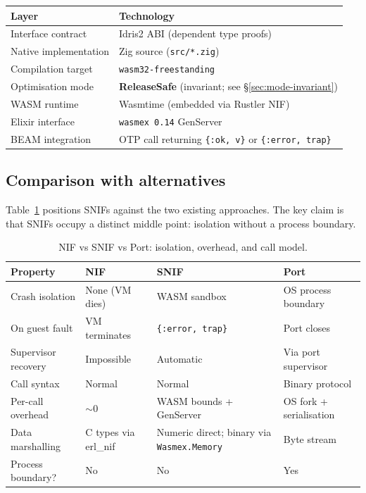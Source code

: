 \documentclass[11pt,a4paper]{article}
\begin{document}
\begin{center}
\begin{tabular}{ll}
\toprule
\textbf{Layer} & \textbf{Technology} \\
\midrule
Interface contract & Idris2 ABI (dependent type proofs) \\
Native implementation & Zig source (\texttt{src/*.zig}) \\
Compilation target & \texttt{wasm32-freestanding} \\
Optimisation mode & \textbf{ReleaseSafe} (invariant; see \S\ref{sec:mode-invariant}) \\
WASM runtime & Wasmtime (embedded via Rustler NIF) \\
Elixir interface & \texttt{wasmex 0.14} GenServer \\
BEAM integration & OTP call returning \texttt{\{:ok, v\}} or \texttt{\{:error, trap\}} \\
\bottomrule
\end{tabular}
\end{center}

\subsection{Comparison with alternatives}

Table~\ref{tab:comparison} positions SNIFs against the two existing approaches.
The key claim is that SNIFs occupy a distinct middle point: isolation without a
process boundary.

\begin{table}[h]
\centering
\begin{tabular}{llll}
\toprule
\textbf{Property} & \textbf{NIF} & \textbf{SNIF} & \textbf{Port} \\
\midrule
Crash isolation       & None (VM dies)      & WASM sandbox          & OS process boundary \\
On guest fault        & VM terminates       & \texttt{\{:error, trap\}} & Port closes \\
Supervisor recovery   & Impossible          & Automatic             & Via port supervisor \\
Call syntax           & Normal              & Normal                & Binary protocol \\
Per-call overhead     & $\sim$0             & WASM bounds + GenServer & OS fork + serialisation \\
Data marshalling      & C types via erl\_nif & Numeric direct; binary via \texttt{Wasmex.Memory} & Byte stream \\
Process boundary?     & No                  & No                    & Yes \\
\bottomrule
\end{tabular}
\caption{NIF vs SNIF vs Port: isolation, overhead, and call model.}
\label{tab:comparison}
\end{table}
\end{document}
